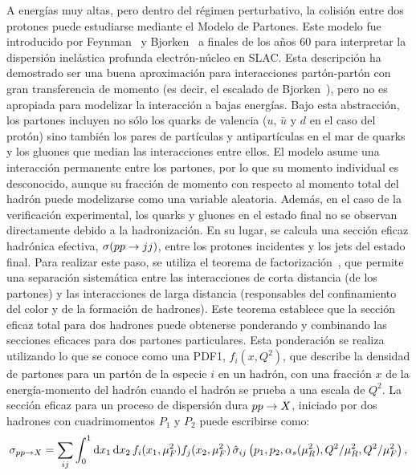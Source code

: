 A energías muy altas, pero dentro del régimen perturbativo, la colisión entre dos protones puede estudiarse mediante el Modelo de Partones. Este modelo fue introducido por Feynman~\cite{Feynman-1969} y Bjorken~\cite{Bjorken-1969_1} a finales de los años 60 para interpretar la dispersión inelástica profunda electrón-núcleo en \ac{SLAC}. Esta descripción ha demostrado ser una buena aproximación para interacciones partón-partón con gran transferencia de momento (es decir, el escalado de Bjorken~\cite{Bjorken-1969_2}), pero no es apropiada para modelizar la interacción a bajas energías.
Bajo esta abstracción, los partones incluyen no sólo los quarks de valencia (\(u\), \(\bar{u}\) y \(d\) en el caso del protón) sino también los pares de partículas y antipartículas en el mar de quarks y los gluones que median las interacciones entre ellos. El modelo asume una interacción permanente entre los partones, por lo que su momento individual es desconocido, aunque su fracción de momento con respecto al momento total del hadrón puede modelizarse como una variable aleatoria.
Además, en el caso de la verificación experimental, los quarks y gluones en el estado final no se observan directamente debido a la hadronización. En su lugar, se calcula una sección eficaz hadrónica efectiva, \(\sigma(pp\rightarrow jj)\), entre los protones incidentes y los jets del estado final. Para realizar este paso, se utiliza el teorema de factorización~\cite{Ellis_Georgi_Politzer_Ross-1978,Feynman-1969,Collins_Soper_Sterman-book,Collins_Soper-1987}, que permite una separación sistemática entre las interacciones de corta distancia (de los partones) y las interacciones de larga distancia (responsables del confinamiento del color y de la formación de hadrones). Este teorema establece que la sección eficaz total para dos hadrones puede obtenerse ponderando y combinando las secciones eficaces para dos partones particulares. Esta ponderación se realiza utilizando lo que se conoce como una \ac{PDF1}, \(f_i(x,Q^2)\), que describe la densidad de partones para un partón de la especie \(i\) en un hadrón, con una fracción \(x\) de la energía-momento del hadrón cuando el hadrón se prueba a una escala de \(Q^2\). La sección eficaz para un proceso de dispersión dura \(pp \rightarrow X\), iniciado por dos hadrones con cuadrimomentos \(P_1\) y \(P_2\) puede escribirse como:
\begin{equation}
    \label{eq:theory:sm:hadron_interactions:xs}
    \sigma_{pp\rightarrow X} = \sum_{ij} \int_0^1 \dd{x_1} \dd{x_2} f_i(x_1, \mu_F^2) f_j(x_2, \mu_F^2) \, \hat{\sigma}_{ij}\left(p_1, p_2, \alpha_s(\mu_R^2), Q^2/\mu_R^2, Q^2/\mu_F^2 \right),
\end{equation}
